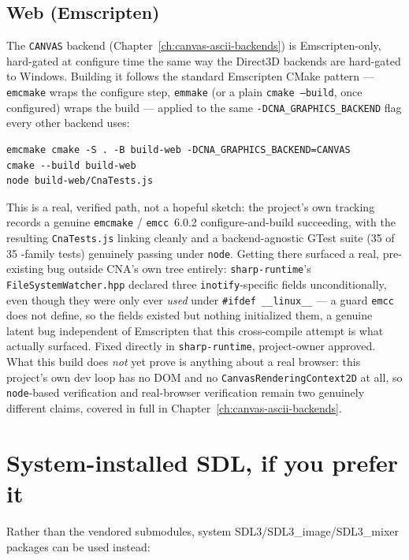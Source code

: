 \subsection{Web (Emscripten)}

The \texttt{CANVAS} backend (Chapter~\ref{ch:canvas-ascii-backends}) is Emscripten-only, hard-gated
at configure time the same way the Direct3D backends are hard-gated to Windows. Building it
follows the standard Emscripten CMake pattern --- \texttt{emcmake} wraps the configure step,
\texttt{emmake} (or a plain \texttt{cmake~--build}, once configured) wraps the build --- applied
to the same \texttt{-DCNA\_GRAPHICS\_BACKEND} flag every other backend uses:

\begin{lstlisting}[style=cnashell]
emcmake cmake -S . -B build-web -DCNA_GRAPHICS_BACKEND=CANVAS
cmake --build build-web
node build-web/CnaTests.js
\end{lstlisting}

This is a real, verified path, not a hopeful sketch: the project's own tracking records a
genuine \texttt{emcmake} / \texttt{emcc}~6.0.2 configure-and-build succeeding, with the resulting
\texttt{CnaTests.js} linking cleanly and a backend-agnostic GTest suite (35 of 35
-family tests) genuinely passing under \texttt{node}. Getting there
surfaced a real, pre-existing bug outside CNA's own tree entirely: \texttt{sharp-runtime}'s
\texttt{FileSystemWatcher.hpp} declared three \texttt{inotify}-specific fields
unconditionally, even though they were only ever \emph{used} under \texttt{\#ifdef
\_\_linux\_\_} --- a guard \texttt{emcc} does not define, so the fields existed but nothing
initialized them, a genuine latent bug independent of Emscripten that this cross-compile
attempt is what actually surfaced. Fixed directly in \texttt{sharp-runtime}, project-owner
approved. What this build does \emph{not} yet prove is anything about a real browser: this
project's own dev loop has no DOM and no \texttt{CanvasRenderingContext2D} at all, so
\texttt{node}-based verification and real-browser verification remain two genuinely different
claims, covered in full in Chapter~\ref{ch:canvas-ascii-backends}.

\section{System-installed SDL, if you prefer it}

Rather than the vendored submodules, system SDL3/SDL3\_image/SDL3\_mixer packages can be
used instead:

